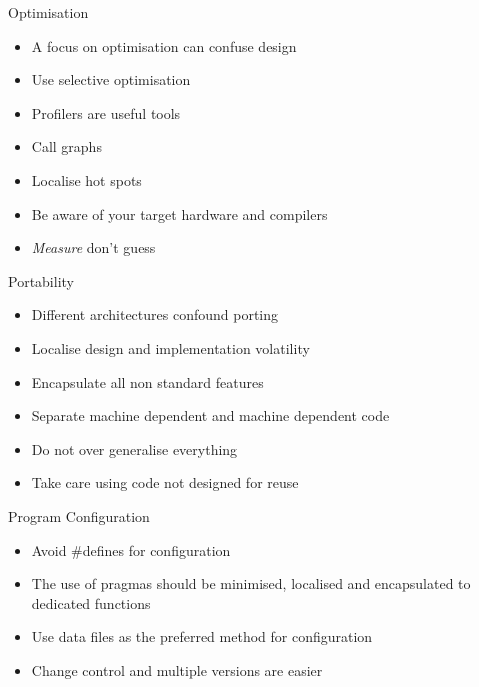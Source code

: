 \documentclass{beamer}
\begin{document}


\begin{frame}{Optimisation}
\begin{itemize}
\item A focus on optimisation can confuse design
\item Use selective optimisation
\item Profilers are useful tools
\item Call graphs
\item Localise hot spots
\item Be aware of your target hardware and compilers
\item \emph{Measure} don't guess
\end{itemize}
\end{frame}


\begin{frame}{Portability}
\begin{itemize}
\item Different architectures confound porting
\item Localise design and implementation volatility
\item Encapsulate all non standard features
\item Separate machine dependent and machine dependent code
\item Do not over generalise everything
\item Take care using code not designed for reuse
\end{itemize}
\end{frame}

\begin{frame}{Program Configuration}
\begin{itemize}
\item Avoid \#defines for configuration
\item The use of pragmas should be minimised, localised and
  encapsulated to dedicated functions
\item Use data files as the preferred method for configuration
\item Change control and multiple versions are easier
\end{itemize}
\end{frame}
\end{document}

